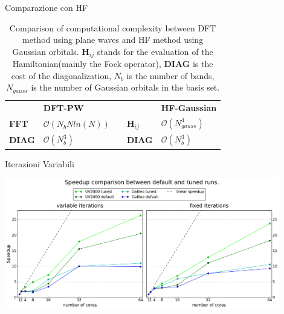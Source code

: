 \documentclass[8pt]{beamer}
\newcommand\mf[1]{\mathbf{#1}}
\newcommand\bigO{\mathcal{O}}
\begin{document}
\begin{frame}{Comparazione con HF}

\begin{table}[h]
\centering
\begin{tabular}{l|l|ll|l|}
\cline{2-2} \cline{5-5}
                                    & \textbf{DFT-PW}        &                       &                    & \textbf{HF-Gaussian} \\ \cline{1-2} \cline{4-5} 
\multicolumn{1}{|l|}{\textbf{FFT}}  & $\bigO(N_{b}N ln(N) )$ & \multicolumn{1}{l|}{} & $\mf{H}_{ij}$ & $\bigO(N_{gauss}^4)$ \\ \cline{1-2} \cline{4-5} 
\multicolumn{1}{|l|}{\textbf{DIAG}} & $\bigO(N_{b}^3)$       & \multicolumn{1}{l|}{} & \textbf{DIAG}      & $\bigO(N_{b}^3)$     \\ \cline{1-2} \cline{4-5} 
\end{tabular}
\caption{Comparison of computational complexity between DFT method using plane waves and HF method using Gaussian orbitals. $\mf{H}_{ij}$ stands for the evaluation of the Hamiltonian(mainly the Fock operator), \textbf{DIAG} is the cost of the diagonalization, $N_b$ is the number of bands, $N_{gauss}$ is the number of Gaussian orbitals in the basis set.}
\label{tab:HF-DFTComp}
\end{table}
\end{frame}


\begin{frame}{Iterazioni Variabili}
	\begin{center}
		\includegraphics[width=0.9\textwidth]{concl_final_comparison.pdf}
	\end{center}
\end{frame}
\end{document}
